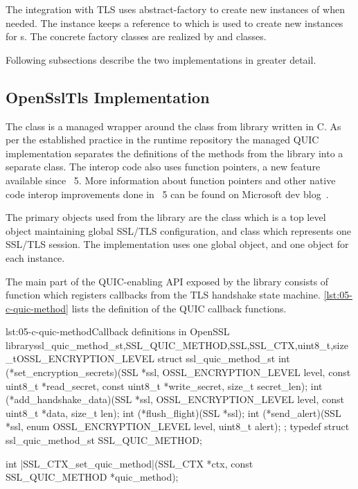 The integration with TLS uses \gls{abstract-factory} to create new instances of \ITls{} when needed.
The \ManagedQuicImplementationProvider{} instance keeps a reference to \QuicTlsProvider{} which is
used to create new \ITls{} instances for \ManagedQuicConnection{}s. The concrete factory classes are
realized by \OpenSslQuicTlsProvider{} and \MockQuicTlsProvider{} classes.

Following subsections describe the two \ITls{} implementations in greater detail.

\subsection{OpenSslTls Implementation}

The \OpenSslTls{} class is a managed wrapper around the \SSL{} class from \libopenssl{} library
written in C. As per the established practice in the \dotnet{} runtime repository the managed QUIC
implementation separates the definitions of the  methods from the \libopenssl{}
library into a separate  class. The interop code also uses \csharp{}
function pointers, a new feature available since \dotnet{}~5. More information about \csharp{}
function pointers and other native code interop improvements done in \dotnet{}~5 can be found on
Microsoft dev blog~\cite{dotnet5interopimprovements}.

The primary objects used from the \libopenssl{} library are the \SSLCTX{} class which is a top level
object maintaining global SSL/TLS configuration, and \SSL{} class which represents one SSL/TLS
session. The \OpenSslTls{} implementation uses one global \SSLCTX{} object, and one \SSL{}
object for each \OpenSslTls{} instance.

The main part of the QUIC-enabling API exposed by the \libopenssl{} library consists of
 function which registers callbacks from the TLS handshake state
machine. \autoref{lst:05-c-quic-method} lists the definition of the \libopenssl{} QUIC callback
functions.

\begin{myListingC}{lst:05-c-quic-method}{Callback definitions in OpenSSL library}{ssl_quic_method_st,SSL_QUIC_METHOD,SSL,SSL_CTX,uint8_t,size_t}{OSSL_ENCRYPTION_LEVEL}
struct ssl_quic_method_st {
    int (*set_encryption_secrets)(SSL *ssl, OSSL_ENCRYPTION_LEVEL level,
                                  const uint8_t *read_secret,
                                  const uint8_t *write_secret,
                                  size_t secret_len);
    int (*add_handshake_data)(SSL *ssl, OSSL_ENCRYPTION_LEVEL level,
                              const uint8_t *data, size_t len);
    int (*flush_flight)(SSL *ssl);
    int (*send_alert)(SSL *ssl, enum OSSL_ENCRYPTION_LEVEL level,
                      uint8_t alert);
};
typedef struct ssl_quic_method_st SSL_QUIC_METHOD;

int |SSL_CTX_set_quic_method|(SSL_CTX *ctx, const SSL_QUIC_METHOD *quic_method);
\end{myListingC}

